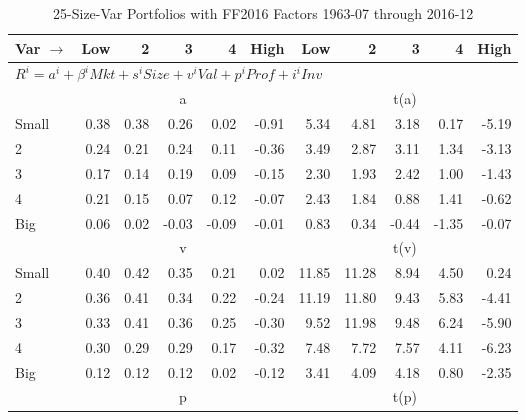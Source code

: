 
\begin{table}[!ht]
\centering
\caption{25-Size-Var Portfolios with FF2016 Factors 1963-07 through 2016-12}
\begin{tabular}{lrrrrrrrrrr}
  \toprule
    Var $\rightarrow$ & Low & 2 & 3 & 4 & High & Low & 2 & 3 & 4 & High \\ 
  \midrule
  \multicolumn{11}{l}{$R^i=a^i+\beta^iMkt+s^iSize+v^iVal+p^iProf+i^iInv$} \\

  
    
      & \multicolumn{5}{c}{a} & \multicolumn{5}{c}{t(a)}
    
    \\
      \cmidrule(r){2-6} \cmidrule(r){7-11}

    Small   & 0.38  & 0.38  & 0.26  & 0.02  & -0.91  & 5.34  & 4.81  & 3.18  & 0.17  & -5.19  \\
         2  & 0.24  & 0.21  & 0.24  & 0.11  & -0.36  & 3.49  & 2.87  & 3.11  & 1.34  & -3.13  \\
         3  & 0.17  & 0.14  & 0.19  & 0.09  & -0.15  & 2.30  & 1.93  & 2.42  & 1.00  & -1.43  \\
         4  & 0.21  & 0.15  & 0.07  & 0.12  & -0.07  & 2.43  & 1.84  & 0.88  & 1.41  & -0.62  \\
    Big     & 0.06  & 0.02  & -0.03  & -0.09  & -0.01  & 0.83  & 0.34  & -0.44  & -1.35  & -0.07  \\

  
    
      & \multicolumn{5}{c}{v} & \multicolumn{5}{c}{t(v)}
    
    \\
      \cmidrule(r){2-6} \cmidrule(r){7-11}

    Small   & 0.40  & 0.42  & 0.35  & 0.21  & 0.02  & 11.85  & 11.28  & 8.94  & 4.50  & 0.24  \\
         2  & 0.36  & 0.41  & 0.34  & 0.22  & -0.24  & 11.19  & 11.80  & 9.43  & 5.83  & -4.41  \\
         3  & 0.33  & 0.41  & 0.36  & 0.25  & -0.30  & 9.52  & 11.98  & 9.48  & 6.24  & -5.90  \\
         4  & 0.30  & 0.29  & 0.29  & 0.17  & -0.32  & 7.48  & 7.72  & 7.57  & 4.11  & -6.23  \\
    Big     & 0.12  & 0.12  & 0.12  & 0.02  & -0.12  & 3.41  & 4.09  & 4.18  & 0.80  & -2.35  \\

  
    
      & \multicolumn{5}{c}{p} & \multicolumn{5}{c}{t(p)}
    

\end{tabular}
\end{table}
